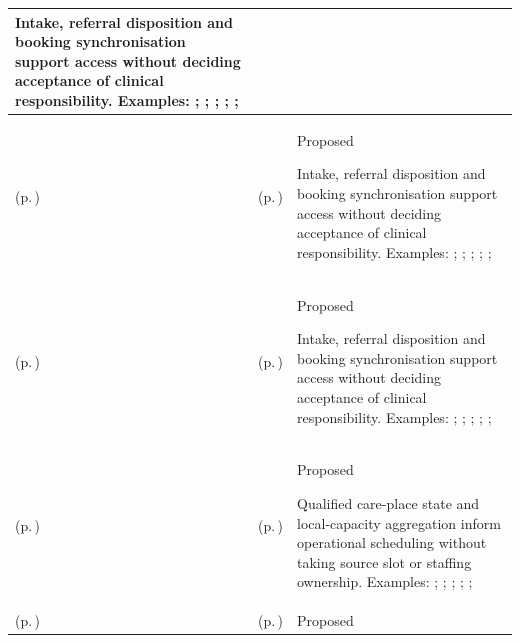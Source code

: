 \begin{longtable}{|>{\raggedright\arraybackslash}p{0.27\TableWidth}|>{\raggedright\arraybackslash}p{0.27\TableWidth}|>{\raggedright\arraybackslash}p{0.46\TableWidth}|}
Intake, referral disposition and booking synchronisation support access without deciding acceptance of clinical responsibility. Examples: \nameref{feature:feat-sa-03}; \nameref{feature:feat-sa-04}; \nameref{feature:feat-sa-05}; \nameref{function:receive-referral}; \nameref{service:referral-submission-service}; \nameref{function:assemble-referral-context}\\\hline
\nameref{cap:bc-care-access-management} (p.\,\pageref{cap:bc-care-access-management}) & \nameref{cap:bec-scheduling-administration} (p.\,\pageref{cap:bec-scheduling-administration}) & Proposed

Intake, referral disposition and booking synchronisation support access without deciding acceptance of clinical responsibility. Examples: \nameref{feature:feat-sa-06}; \nameref{feature:feat-sa-07}; \nameref{function:receive-appointment-notification}; \nameref{service:appointment-notification-ingress}; \nameref{function:synchronise-appointment-status}; \nameref{service:appointment-schedule-query}\\\hline
\nameref{cap:bc-care-access-management} (p.\,\pageref{cap:bc-care-access-management}) & \nameref{cap:bec-client-centred-administration} (p.\,\pageref{cap:bec-client-centred-administration}) & Proposed

Intake, referral disposition and booking synchronisation support access without deciding acceptance of clinical responsibility. Examples: \nameref{feature:feat-sa-01}; \nameref{feature:feat-sa-02}; \nameref{function:receive-client-demographic-change}; \nameref{service:demographic-intake-service}; \nameref{function:distribute-governed-demographic-change}; \nameref{service:demographic-update-notification}\\\hline
\nameref{cap:bc-care-scheduling-capacity-management} (p.\,\pageref{cap:bc-care-scheduling-capacity-management}) & \nameref{cap:bec-bed-care-place-management} (p.\,\pageref{cap:bec-bed-care-place-management}) & Proposed

Qualified care-place state and local-capacity aggregation inform operational scheduling without taking source slot or staffing ownership. Examples: \nameref{feature:feat-hso-11}; \nameref{feature:feat-hso-12}; \nameref{feature:feat-hso-13}; \nameref{function:maintain-operational-bed-state}; \nameref{service:bed-availability-query}; \nameref{function:manage-bed-turnover-progression}\\\hline
\nameref{cap:bc-care-scheduling-capacity-management} (p.\,\pageref{cap:bc-care-scheduling-capacity-management}) & \nameref{cap:bec-service-capacity-management} (p.\,\pageref{cap:bec-service-capacity-management}) & Proposed


\end{longtable}
